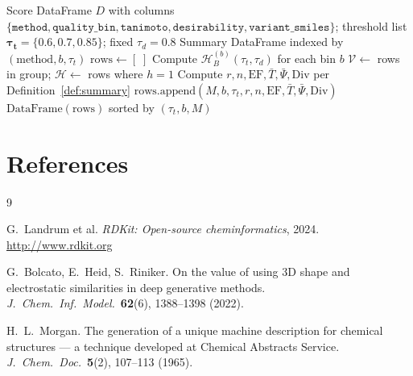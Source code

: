 \documentclass[11pt, a4paper]{article}
\theoremstyle{definition}
\newcommand{\1}[1]{\mathbf{1}\!\left[#1\right]}   %
\newcommand{\Hit}{\mathcal{H}}                      %
\begin{document}
\begin{algorithm}[H]
\caption{\textsc{Summarize}$(D,\, \boldsymbol{\tau_t},\, \tau_d)$ --- multi-threshold stratified summary}
\label{alg:summarize}
\begin{algorithmic}[1]
\Require Score DataFrame $D$ with columns
  $\{\texttt{method}, \texttt{quality\_bin}, \texttt{tanimoto},
     \texttt{desirability}, \texttt{variant\_smiles}\}$;
  threshold list $\boldsymbol{\tau_t} = \{0.6, 0.7, 0.85\}$;
  fixed $\tau_d = 0.8$
\Ensure  Summary DataFrame indexed by $(\text{method}, b, \tau_t)$
\State $\text{rows} \leftarrow [\;]$
  \State Compute $\Hit_B^{(b)}(\tau_t,\tau_d)$ for each bin $b$
    \State $\mathcal{V} \leftarrow $ rows in group; $\Hit \leftarrow $ rows where $h = 1$
    \State Compute $r, n, \text{EF}, \bar{T}, \bar{\Psi}, \text{Div}$
           per Definition~\ref{def:summary}
    \State $\text{rows.append}(M, b, \tau_t, r, n, \text{EF}, \bar{T}, \bar{\Psi}, \text{Div})$
  \EndFor
\EndFor
\Return $\text{DataFrame}(\text{rows})$ sorted by $(\tau_t, b, M)$
\end{algorithmic}
\end{algorithm}


\section*{References}

\begin{thebibliography}{9}

G.~Landrum et al.
\textit{RDKit: Open-source cheminformatics}, 2024.
\url{http://www.rdkit.org}

G.~Bolcato, E.~Heid, S.~Riniker.
On the value of using 3D shape and electrostatic similarities in deep
generative methods.
\textit{J.\ Chem.\ Inf.\ Model.}\ \textbf{62}(6), 1388--1398 (2022).

H.~L.~Morgan.
The generation of a unique machine description for chemical structures ---
a technique developed at Chemical Abstracts Service.
\textit{J.\ Chem.\ Doc.}\ \textbf{5}(2), 107--113 (1965).

\end{thebibliography}
\end{document}
